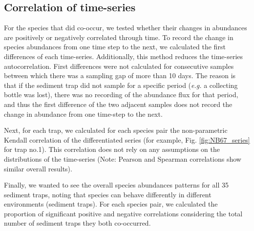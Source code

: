 \subsection{Correlation of time-series}

For the species that did co-occur, we tested whether their changes in abundances are positively or negatively correlated through time. To record the change in species abundances from one time step to the next, we calculated the first differences of each time-series. Additionally, this method reduces the time-series autocorrelation. %
First differences were not calculated for consecutive samples between which there was a sampling gap of more than 10 days. The reason is that if the sediment trap did not sample for a specific period (\textit{e.g.} a collecting bottle was lost), there was no recording of the abundance flux for that period, and thus the first difference of the two adjacent samples does not record the change in abundance from one time-step to the next.

Next, for each trap, we calculated for each species pair the non-parametric Kendall correlation of the differentiated series (for example, Fig. \ref{fig:NB67_series} for trap no.1). This correlation does not rely on any assumptions on the distributions of the time-series (Note: Pearson and Spearman correlations show similar overall results). 

Finally, we wanted to see the overall species abundances patterns for all 35 sediment traps, noting that species can behave differently in different environments (sediment traps). For each species pair, we calculated the proportion of significant positive and negative correlations considering the total number of sediment traps they both co-occurred.


